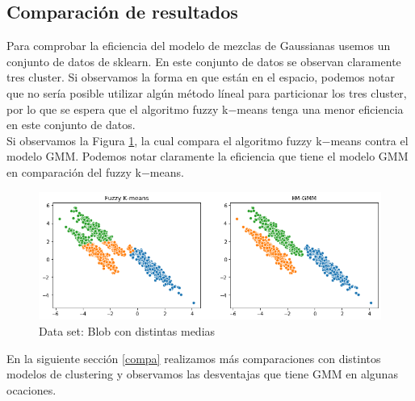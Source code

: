 \documentclass[paper=letter, fontsize=11pt]{scrartcl}
\numberwithin{equation}{section} %
\numberwithin{figure}{section} %
\numberwithin{table}{section} %
\begin{document}
\subsection{Comparación de resultados}
Para comprobar la eficiencia del modelo de mezclas de Gaussianas usemos un conjunto de datos de sklearn. En este conjunto de datos se observan claramente tres cluster. Si observamos la forma en que están en el espacio, podemos notar que no sería posible utilizar algún método líneal para particionar los tres cluster, por lo que se espera que el algoritmo fuzzy k$-$means tenga una menor eficiencia en este conjunto de datos.\\

Si observamos la Figura \ref{fig:em_gmm}, la cual compara el algoritmo fuzzy k$-$means contra el modelo GMM. Podemos notar claramente la eficiencia que tiene el modelo GMM en comparación del fuzzy k$-$means.

\begin{figure}[H]
    \centering
    \includegraphics[scale=0.7]{figure/em_gmm.png}
    \caption{Data set: Blob con distintas medias}
    \label{fig:em_gmm}
\end{figure}
En la siguiente sección \ref{compa} realizamos más comparaciones con distintos modelos de clustering y observamos las desventajas que tiene GMM en algunas ocaciones.
\end{document}
